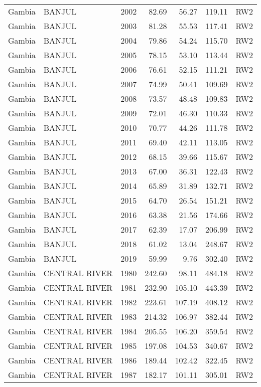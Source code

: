 \begin{longtable}{lllrrrl}
  Gambia & BANJUL & 2002 & 82.69 & 56.27 & 119.11 & RW2 \\ 
  Gambia & BANJUL & 2003 & 81.28 & 55.53 & 117.41 & RW2 \\ 
  Gambia & BANJUL & 2004 & 79.86 & 54.24 & 115.70 & RW2 \\ 
  Gambia & BANJUL & 2005 & 78.15 & 53.10 & 113.44 & RW2 \\ 
  Gambia & BANJUL & 2006 & 76.61 & 52.15 & 111.21 & RW2 \\ 
  Gambia & BANJUL & 2007 & 74.99 & 50.41 & 109.69 & RW2 \\ 
  Gambia & BANJUL & 2008 & 73.57 & 48.48 & 109.83 & RW2 \\ 
  Gambia & BANJUL & 2009 & 72.01 & 46.30 & 110.33 & RW2 \\ 
  Gambia & BANJUL & 2010 & 70.77 & 44.26 & 111.78 & RW2 \\ 
  Gambia & BANJUL & 2011 & 69.40 & 42.11 & 113.05 & RW2 \\ 
  Gambia & BANJUL & 2012 & 68.15 & 39.66 & 115.67 & RW2 \\ 
  Gambia & BANJUL & 2013 & 67.00 & 36.31 & 122.43 & RW2 \\ 
  Gambia & BANJUL & 2014 & 65.89 & 31.89 & 132.71 & RW2 \\ 
  Gambia & BANJUL & 2015 & 64.70 & 26.54 & 151.21 & RW2 \\ 
  Gambia & BANJUL & 2016 & 63.38 & 21.56 & 174.66 & RW2 \\ 
  Gambia & BANJUL & 2017 & 62.39 & 17.07 & 206.99 & RW2 \\ 
  Gambia & BANJUL & 2018 & 61.02 & 13.04 & 248.67 & RW2 \\ 
  Gambia & BANJUL & 2019 & 59.99 & 9.76 & 302.40 & RW2 \\ 
  Gambia & CENTRAL RIVER & 1980 & 242.60 & 98.11 & 484.18 & RW2 \\ 
  Gambia & CENTRAL RIVER & 1981 & 232.90 & 105.10 & 443.39 & RW2 \\ 
  Gambia & CENTRAL RIVER & 1982 & 223.61 & 107.19 & 408.12 & RW2 \\ 
  Gambia & CENTRAL RIVER & 1983 & 214.32 & 106.97 & 382.44 & RW2 \\ 
  Gambia & CENTRAL RIVER & 1984 & 205.55 & 106.20 & 359.54 & RW2 \\ 
  Gambia & CENTRAL RIVER & 1985 & 197.08 & 104.53 & 340.67 & RW2 \\ 
  Gambia & CENTRAL RIVER & 1986 & 189.44 & 102.42 & 322.45 & RW2 \\ 
  Gambia & CENTRAL RIVER & 1987 & 182.17 & 101.11 & 305.01 & RW2 \\ 

\end{longtable}

